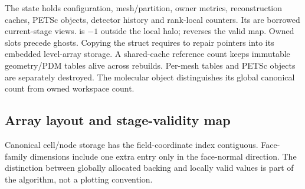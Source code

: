 The  state holds configuration, mesh/partition, owner metrics,
reconstruction caches, PETSc objects, detector history and rank-local
counters. Its  are borrowed current-stage views.
 is $-1$ outside the local halo;
 reverses the valid map. Owned slots precede ghosts.
Copying the struct requires  to repair pointers into its
embedded level-array storage. A shared-cache reference count keeps immutable
geometry/PDM tables alive across rebuilds. Per-mesh tables and PETSc objects
are separately destroyed. The molecular object distinguishes its global
canonical count from owned workspace count.

\subsection{Array layout and stage-validity map}
Canonical cell/node storage has the field-coordinate index contiguous.
Face-family dimensions include one extra entry only in the face-normal
direction. The distinction between globally allocated backing and locally
valid values is part of the algorithm, not a plotting convention.
